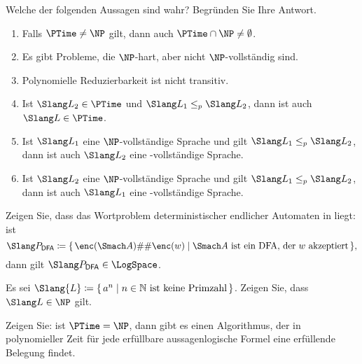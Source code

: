 \documentclass[german]{latteachCD}[2017/03/28]
\begin{document}
\vspace*{0.5\baselineskip}

\setcounter{exercise}{0}

\begin{exercise}
  Welche der folgenden Aussagen sind wahr?  Begründen Sie Ihre Antwort.
  \begin{enumerate}
  \item Falls $\PTime \neq \NP$ gilt, dann auch $\PTime \cap \NP \neq \emptyset$.
  \item Es gibt Probleme, die $\NP$-hart, aber nicht $\NP$-vollständig sind.
  \item Polynomielle Reduzierbarkeit ist nicht transitiv.
  \item Ist $\Slang L_{2} \in \PTime$ und $\Slang L_{1} \leq_{p} \Slang L_{2}$,
    dann ist auch $\Slang L \in \PTime$.
  \item Ist $\Slang L_{1}$ eine $\NP$-vollständige Sprache und gilt $\Slang
    L_{1} \leq_{p} \Slang L_{2}$, dann ist auch $\Slang L_{2}$ eine
    \NP-vollständige Sprache.
  \item Ist $\Slang L_{2}$ eine $\NP$-vollständige Sprache und gilt $\Slang
    L_{1} \leq_{p} \Slang L_{2}$, dann ist auch $\Slang L_{1}$ eine
    \NP-vollständige Sprache.
  \end{enumerate}
\end{exercise}

\begin{exercise}
  Zeigen Sie, dass das Wortproblem deterministischer endlicher Automaten in
  \LogSpace liegt: ist
  \begin{equation*}
    \Slang P_{\mathsf{DFA}} \coloneqq \{\,\enc(\Smach A)\#\#\enc(w) \mid
    \Smach A \text{ ist ein DFA, der $w$ akzeptiert}\,\},
  \end{equation*}
  dann gilt $\Slang P_{\mathsf{DFA}} \in \LogSpace$.
\end{exercise}

\begin{exercise}
  Es sei $\Slang{L} \coloneqq \{\,a^{n} \mid n \in \mathbb N \text{ ist keine
    Primzahl}\,\}$.  Zeigen Sie, dass $\Slang L \in \NP$ gilt.
\end{exercise}

\begin{exercise}
  Zeigen Sie: ist $\PTime = \NP$, dann gibt es einen Algorithmus, der in
  polynomieller Zeit für jede erfüllbare aussagenlogische Formel eine erfüllende
  Belegung findet.
\end{exercise}
\end{document}
